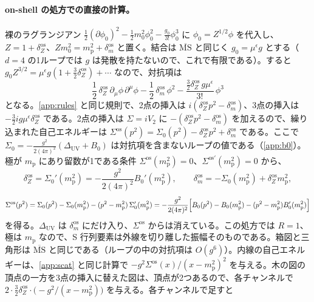 \documentclass[a4paper,10pt]{ltjsarticle}
\begin{document}
\paragraph{on-shell の処方での直接の計算。}裸のラグランジアン $\frac12(\partial\phi_0)^2-\frac12m_0^2\phi_0^2-\frac{g_0}{3!}\phi_0^3$ に $\phi_0=Z^{1/2}\phi$ を代入し、$Z=1+\delta_Z^{\mathrm{os}}$、$Zm_0^2=m_{\mathrm p}^2+\delta_m^{\mathrm{os}}$ と置く。結合は $\overline{\mathrm{MS}}$ と同じく $g_0=\mu^\epsilon g$ とする（$d=4$ の1ループでは $g$ は発散を持たないので、これで有限である）。すると $g_0Z^{3/2}=\mu^\epsilon g(1+\frac32\delta_Z^{\mathrm{os}})+\cdots$ なので、対抗項は
\begin{equation*}
\frac12\,\delta_Z^{\mathrm{os}}\,\partial_\mu\phi\,\partial^\mu\phi-\frac12\,\delta_m^{\mathrm{os}}\,\phi^2-\frac{\frac32\delta_Z^{\mathrm{os}}\,g\mu^\epsilon}{3!}\,\phi^3
\end{equation*}
となる。\ref{app:rules} と同じ規則で、2点の挿入は $i(\delta_Z^{\mathrm{os}}p^2-\delta_m^{\mathrm{os}})$、3点の挿入は $-\frac32ig\mu^\epsilon\delta_Z^{\mathrm{os}}$ である。2点の挿入は $\Sigma=iV_2$ に $-(\delta_Z^{\mathrm{os}}p^2-\delta_m^{\mathrm{os}})$ を加えるので、繰り込まれた自己エネルギーは $\Sigma^{\mathrm{os}}(p^2)=\Sigma_0(p^2)-\delta_Z^{\mathrm{os}}p^2+\delta_m^{\mathrm{os}}$ である。ここで $\Sigma_0=-\frac{g^2}{2(4\pi)^2}(\Delta_{\mathrm{UV}}+B_0)$ は対抗項を含まないループの値である（\ref{app:b0}）。極が $m_{\mathrm p}$ にあり留数が1である条件 $\Sigma^{\mathrm{os}}(m_{\mathrm p}^2)=0$、$\Sigma^{\mathrm{os}\prime}(m_{\mathrm p}^2)=0$ から、
\begin{equation*}
\delta_Z^{\mathrm{os}}=\Sigma_0'(m_{\mathrm p}^2)=-\frac{g^2}{2(4\pi)^2}B_0'(m_{\mathrm p}^2),\qquad
\delta_m^{\mathrm{os}}=-\Sigma_0(m_{\mathrm p}^2)+\delta_Z^{\mathrm{os}}m_{\mathrm p}^2,
\end{equation*}
\begin{equation*}
\Sigma^{\mathrm{os}}(p^2)=\Sigma_0(p^2)-\Sigma_0(m_{\mathrm p}^2)-(p^2-m_{\mathrm p}^2)\,\Sigma_0'(m_{\mathrm p}^2)=-\frac{g^2}{2(4\pi)^2}\Bigl[B_0(p^2)-B_0(m_{\mathrm p}^2)-(p^2-m_{\mathrm p}^2)B_0'(m_{\mathrm p}^2)\Bigr]
\end{equation*}
を得る。$\Delta_{\mathrm{UV}}$ は $\delta_m^{\mathrm{os}}$ にだけ入り、$\Sigma^{\mathrm{os}}$ からは消えている。この処方では $R=1$、極は $m_{\mathrm p}$ なので、S 行列要素は外線を切り離した振幅そのものである。箱図と三角形は $\overline{\mathrm{MS}}$ と同じである（ループの中の対抗項は $O(g^6)$）。内線の自己エネルギーは、\ref{app:scat} と同じ計算で $-g^2\Sigma^{\mathrm{os}}(x)/(x-m_{\mathrm p}^2)^2$ を与える。木の図の頂点の一方を3点の挿入に替えた図は、頂点が2つあるので、各チャンネルで $2\cdot\frac32\delta_Z^{\mathrm{os}}\cdot\bigl(-g^2/(x-m_{\mathrm p}^2)\bigr)$ を与える。各チャンネルで足すと
\end{document}
